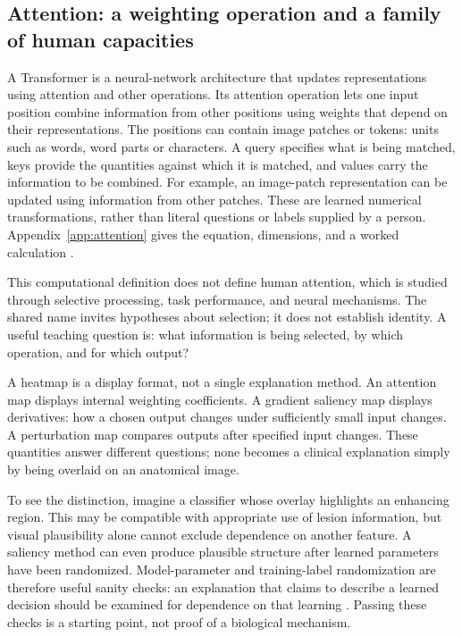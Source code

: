 \documentclass[11pt,a4paper]{article}
\begin{document}

\subsection{Attention: a weighting operation and a family of human capacities}
A Transformer is a neural-network architecture that updates representations using attention and other operations. Its attention operation lets one input position combine information from other positions using weights that depend on their representations. The positions can contain image patches or tokens: units such as words, word parts or characters. A query specifies what is being matched, keys provide the quantities against which it is matched, and values carry the information to be combined. For example, an image-patch representation can be updated using information from other patches. These are learned numerical transformations, rather than literal questions or labels supplied by a person. Appendix~\ref{app:attention} gives the equation, dimensions, and a worked calculation \citep{vaswani2017}.

This computational definition does not define human attention, which is studied through selective processing, task performance, and neural mechanisms. The shared name invites hypotheses about selection; it does not establish identity. A useful teaching question is: what information is being selected, by which operation, and for which output?

A heatmap is a display format, not a single explanation method. An attention map displays internal weighting coefficients. A gradient saliency map displays derivatives: how a chosen output changes under sufficiently small input changes. A perturbation map compares outputs after specified input changes. These quantities answer different questions; none becomes a clinical explanation simply by being overlaid on an anatomical image.

To see the distinction, imagine a classifier whose overlay highlights an enhancing region. This may be compatible with appropriate use of lesion information, but visual plausibility alone cannot exclude dependence on another feature. A saliency method can even produce plausible structure after learned parameters have been randomized. Model-parameter and training-label randomization are therefore useful sanity checks: an explanation that claims to describe a learned decision should be examined for dependence on that learning \citep{adebayo2018}. Passing these checks is a starting point, not proof of a biological mechanism.
\end{document}
